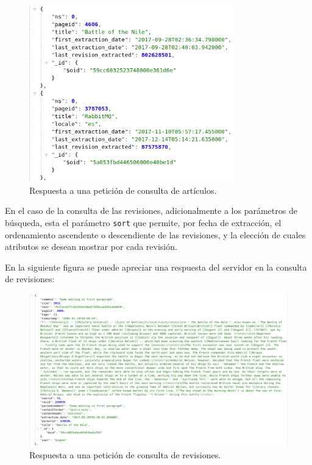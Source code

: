 \begin{figure}[H]
	\centering
		\includegraphics[width=0.8\textwidth]{figures/response_articles}
	\caption{Respuesta a una petición de consulta de artículos.}
	\label{fig:response_articles}
\end{figure}

En el caso de la consulta de las revisiones, adicionalmente a los parámetros de búsqueda, esta el parámetro \texttt{sort} que permite, por fecha de extracción, el
ordenamiento ascendente o descendiente de las revisiones, y la elección de cuales
atributos se desean mostrar por cada revisión.

En la siguiente figura se puede apreciar una respuesta del servidor en la consulta de
revisiones:

\begin{figure}[H]
	\centering
		\includegraphics[width=1\textwidth]{figures/response_revisions}
	\caption{Respuesta a una petición de consulta de revisiones.}
	\label{fig:response_revisions}
\end{figure}

